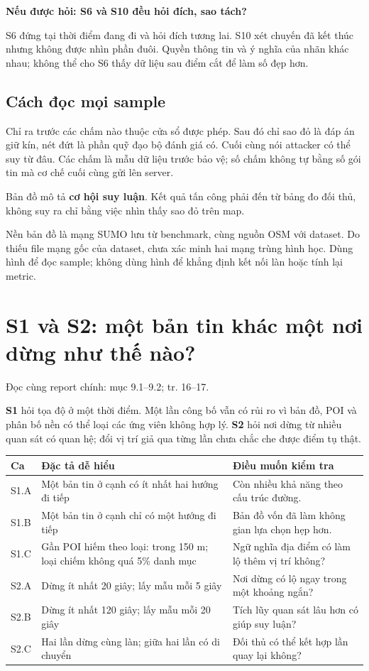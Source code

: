 \documentclass[10pt,a4paper]{article}
\newcommand{\key}[1]{\par\smallskip\noindent\colorbox{pale}{\parbox{\dimexpr\linewidth-2\fboxsep}{#1}}\par\smallskip}
\newcommand{\ask}[2]{\par\textbf{Nếu được hỏi: #1}\par #2\par}
\newcommand{\where}[1]{\par{\small\color{gray}Đọc cùng report chính: #1.}\par}
\newcommand{\guidepage}[1]{\clearpage\section{#1}}
\begin{document}
\ask{S6 và S10 đều hỏi đích, sao tách?}{S6 đứng tại thời điểm đang đi và hỏi đích tương lai. S10 xét chuyến đã kết thúc nhưng không được nhìn phần đuôi. Quyền thông tin và ý nghĩa của nhãn khác nhau; không thể cho S6 thấy dữ liệu sau điểm cắt để làm số đẹp hơn.}

\subsection*{Cách đọc mọi sample}
Chỉ ra trước các chấm nào thuộc cửa sổ được phép. Sau đó chỉ sao đỏ là đáp án giữ kín, nét đứt là phần quỹ đạo bộ đánh giá có. Cuối cùng nói attacker có thể suy từ đâu. Các chấm là mẫu dữ liệu trước bảo vệ; số chấm không tự bằng số gói tin mà cơ chế cuối cùng gửi lên server.
\key{Bản đồ mô tả \textbf{cơ hội suy luận}. Kết quả tấn công phải đến từ bảng đo đối thủ, không suy ra chỉ bằng việc nhìn thấy sao đỏ trên map.}
Nền bản đồ là mạng SUMO lưu từ benchmark, cùng nguồn OSM với dataset. Do thiếu file mạng gốc của dataset, chưa xác minh hai mạng trùng hình học. Dùng hình để đọc sample; không dùng hình để khẳng định kết nối làn hoặc tính lại metric.

\guidepage{S1 và S2: một bản tin khác một nơi dừng như thế nào?}
\where{mục 9.1--9.2; tr. 16--17}
\textbf{S1} hỏi tọa độ ở một thời điểm. Một lần công bố vẫn có rủi ro vì bản đồ, POI và phân bố nền có thể loại các ứng viên không hợp lý. \textbf{S2} hỏi nơi dừng từ nhiều quan sát có quan hệ; đổi vị trí giả qua từng lần chưa chắc che được điểm tụ thật.

\begin{longtable}{@{}P{1.7cm}P{7.7cm}P{6.8cm}@{}}
\toprule Ca & Đặc tả dễ hiểu & Điều muốn kiểm tra\\\midrule
S1.A & Một bản tin ở cạnh có ít nhất hai hướng đi tiếp & Còn nhiều khả năng theo cấu trúc đường.\\[3pt]
S1.B & Một bản tin ở cạnh chỉ có một hướng đi tiếp & Bản đồ vốn đã làm không gian lựa chọn hẹp hơn.\\[3pt]
S1.C & Gần POI hiếm theo loại: trong 150 m; loại chiếm không quá 5\% danh mục & Ngữ nghĩa địa điểm có làm lộ thêm vị trí không?\\[3pt]
S2.A & Dừng ít nhất 20 giây; lấy mẫu mỗi 5 giây & Nơi dừng có lộ ngay trong một khoảng ngắn?\\[3pt]
S2.B & Dừng ít nhất 120 giây; lấy mẫu mỗi 20 giây & Tích lũy quan sát lâu hơn có giúp suy luận?\\[3pt]
S2.C & Hai lần dừng cùng làn; giữa hai lần có di chuyển & Đối thủ có thể kết hợp lần quay lại không?\\
\bottomrule
\end{longtable}
\end{document}
